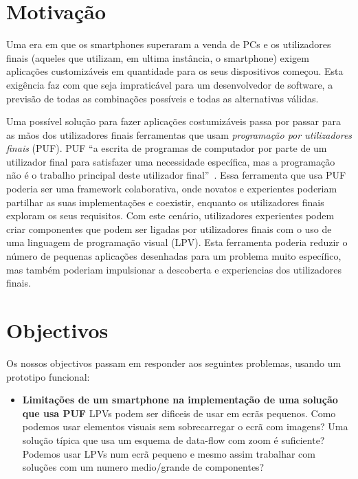 \documentclass[9pt,a4paper]{extarticle}
\begin{document}
\begin{multicols}{2}

\section{Motivação}\label{sec:motiva}

Uma era em que os smartphones superaram a venda de PCs e os utilizadores finais (aqueles que utilizam, em ultima instância, o smartphone) exigem aplicações customizáveis em quantidade para os seus dispositivos começou. Esta exigência faz com que seja impraticável para um desenvolvedor de software, a previsão de todas as combinações possíveis e todas as alternativas válidas.

Uma possível solução para fazer aplicações costumizáveis passa por passar para as mãos dos utilizadores finais ferramentas que usam \emph{programação por utilizadores finais} (PUF).
PUF ``a escrita de programas de computador por parte de um utilizador final para satisfazer uma necessidade específica, mas a programação não é o trabalho principal deste utilizador final''~\cite{EUSEReport}.
Essa ferramenta que usa PUF poderia ser uma framework colaborativa, onde novatos e experientes poderiam partilhar as suas implementações e coexistir, enquanto os utilizadores finais exploram os seus requisitos.
Com este cenário, utilizadores experientes podem criar componentes que podem ser ligadas por utilizadores finais com o uso de uma linguagem de programação visual (LPV).
Esta ferramenta poderia reduzir o número de pequenas aplicações desenhadas para um problema muito específico, mas também poderiam impulsionar a descoberta e experiencias dos utilizadores finais.

\section{Objectivos}\label{sec:goals}

Os nossos objectivos passam em responder aos seguintes problemas, usando um prototipo funcional:

\begin{itemize}
	\item{\textbf{Limitações de um smartphone na implementação de uma solução que usa PUF} 
	LPVs podem ser dificeis de usar em ecrãs pequenos. Como podemos usar elementos visuais sem sobrecarregar o ecrã com imagens? Uma solução típica que usa um esquema de data-flow com zoom é suficiente? Podemos usar LPVs num ecrã pequeno
	e mesmo assim trabalhar com soluções com um numero medio/grande de componentes?}


\end{itemize}
\end{multicols}
\end{document}
